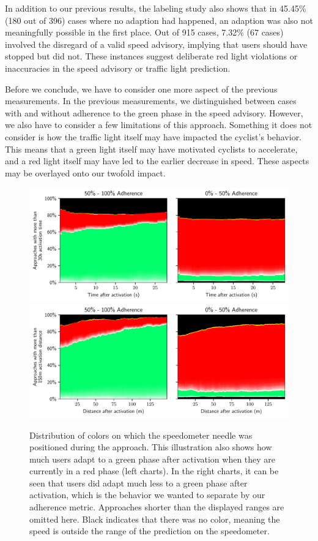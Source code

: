 In addition to our previous results, the labeling study also shows that in 45.45\% (180 out of 396) cases where no adaption had happened, an adaption was also not meaningfully possible in the first place. Out of 915 cases, 7.32\% (67 cases) involved the disregard of a valid speed advisory, implying that users should have stopped but did not. These instances suggest deliberate red light violations or inaccuracies in the speed advisory or traffic light prediction.

Before we conclude, we have to consider one more aspect of the previous measurements. In the previous measurements, we distinguished between cases with and without adherence to the green phase in the speed advisory. However, we also have to consider a few limitations of this approach. Something it does not consider is how the traffic light itself may have impacted the cyclist's behavior. This means that a green light itself may have motivated cyclists to accelerate, and a red light itself may have led to the earlier decrease in speed. These aspects may be overlayed onto our twofold impact. 

\begin{figure}[!t]
\caption{Distribution of colors on which the speedometer needle was positioned during the approach. This illustration also shows how much users adapt to a green phase after activation when they are currently in a red phase (left charts). In the right charts, it can be seen that users did adapt much less to a green phase after activation, which is the behavior we wanted to separate by our adherence metric. Approaches shorter than the displayed ranges are omitted here. Black indicates that there was no color, meaning the speed is outside the range of the prediction on the speedometer.}\label{fig:impact-adherence-discussion}
\includegraphics[width=\linewidth]{images/impacts-activation-time.pdf} 
\\
\includegraphics[width=\linewidth]{images/impacts-activation-distance.pdf}
\end{figure}

